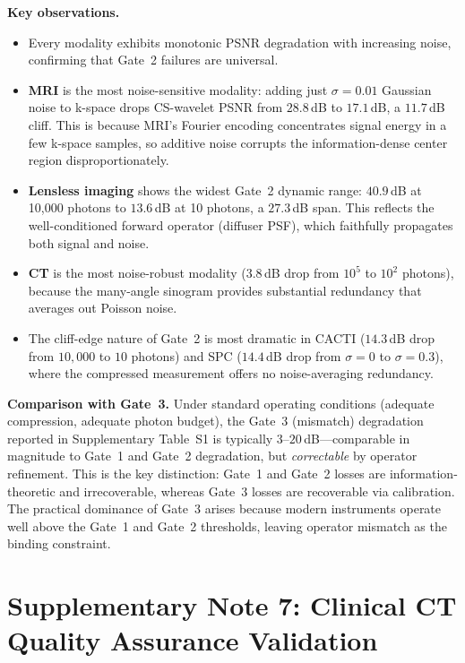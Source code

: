 \documentclass[11pt]{article}
\begin{document}
\noindent\textbf{Key observations.}
\begin{itemize}
  \item Every modality exhibits monotonic PSNR degradation with
    increasing noise, confirming that Gate~2 failures are universal.
  \item \textbf{MRI} is the most noise-sensitive modality: adding just
    $\sigma{=}0.01$ Gaussian noise to k-space drops CS-wavelet PSNR from
    $28.8$\,dB to $17.1$\,dB, a $11.7$\,dB cliff. This is because MRI's
    Fourier encoding concentrates signal energy in a few k-space samples,
    so additive noise corrupts the information-dense center region
    disproportionately.
  \item \textbf{Lensless imaging} shows the widest Gate~2 dynamic range:
    $40.9$\,dB at 10,000 photons to $13.6$\,dB at 10 photons, a $27.3$\,dB
    span. This reflects the well-conditioned forward operator (diffuser PSF),
    which faithfully propagates both signal and noise.
  \item \textbf{CT} is the most noise-robust modality ($3.8$\,dB drop from
    $10^5$ to $10^2$ photons), because the many-angle sinogram provides
    substantial redundancy that averages out Poisson noise.
  \item The cliff-edge nature of Gate~2 is most dramatic in CACTI
    ($14.3$\,dB drop from $10{,}000$ to $10$ photons) and SPC
    ($14.4$\,dB drop from $\sigma{=}0$ to $\sigma{=}0.3$), where the
    compressed measurement offers no noise-averaging redundancy.
\end{itemize}

\noindent\textbf{Comparison with Gate~3.}
Under standard operating conditions (adequate compression, adequate
photon budget), the Gate~3 (mismatch) degradation reported in
Supplementary Table~S1 is typically $3$--$20$\,dB---comparable in
magnitude to Gate~1 and Gate~2 degradation, but \emph{correctable} by
operator refinement.  This is the key distinction: Gate~1 and Gate~2
losses are information-theoretic and irrecoverable, whereas Gate~3
losses are recoverable via calibration.  The practical dominance of
Gate~3 arises because modern instruments operate well above the Gate~1
and Gate~2 thresholds, leaving operator mismatch as the binding
constraint.


\newpage
\section{Supplementary Note 7: Clinical CT Quality Assurance Validation}
\label{sec:ctqc}
\end{document}
